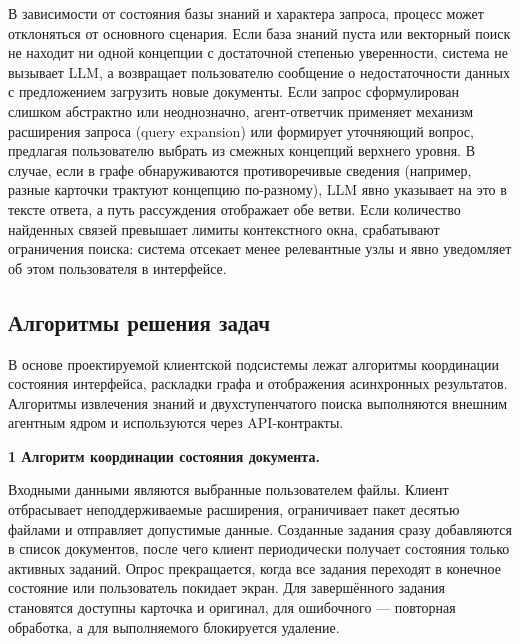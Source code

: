 В зависимости от состояния базы знаний и характера запроса, процесс может отклоняться от основного сценария. Если база знаний пуста или векторный поиск не находит ни одной концепции с достаточной степенью уверенности, система не вызывает LLM, а возвращает пользователю сообщение о недостаточности данных с предложением загрузить новые документы. Если запрос сформулирован слишком абстрактно или неоднозначно, агент-ответчик применяет механизм расширения запроса (query expansion) или формирует уточняющий вопрос, предлагая пользователю выбрать из смежных концепций верхнего уровня. В случае, если в графе обнаруживаются противоречивые сведения (например, разные карточки трактуют концепцию по-разному), LLM явно указывает на это в тексте ответа, а путь рассуждения отображает обе ветви. Если количество найденных связей превышает лимиты контекстного окна, срабатывают ограничения поиска: система отсекает менее релевантные узлы и явно уведомляет об этом пользователя в интерфейсе.

\subsection{Алгоритмы решения задач}
%

%
В основе проектируемой клиентской подсистемы лежат алгоритмы координации состояния интерфейса, раскладки графа и отображения асинхронных результатов. Алгоритмы извлечения знаний и двухступенчатого поиска выполняются внешним агентным ядром и используются через API-контракты.

\vspace{0.5em}
\textbf{1 Алгоритм координации состояния документа.}

Входными данными являются выбранные пользователем файлы. Клиент отбрасывает неподдерживаемые расширения, ограничивает пакет десятью файлами и отправляет допустимые данные. Созданные задания сразу добавляются в список документов, после чего клиент периодически получает состояния только активных заданий. Опрос прекращается, когда все задания переходят в конечное состояние или пользователь покидает экран. Для завершённого задания становятся доступны карточка и оригинал, для ошибочного --- повторная обработка, а для выполняемого блокируется удаление.

